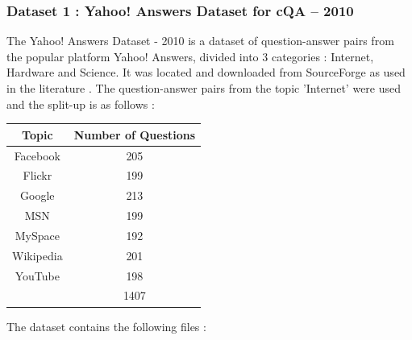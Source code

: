 \documentclass[12pt, a4paper]{article}
\begin{document}
\subsubsection{Dataset 1 : Yahoo! Answers Dataset for cQA – 2010} 

The Yahoo! Answers Dataset - 2010 is a dataset of question-answer pairs from the popular platform Yahoo! Answers, divided into 3 categories : Internet, Hardware and Science. It was located and downloaded from SourceForge \cite{dataset1} as used in the literature \cite{maincqa}. The question-answer pairs from the topic 'Internet' were used and the split-up is as follows : 

\begin{center}
  \renewcommand{\arraystretch}{1.5}
  \begin{tabular}{c|c}
    Topic&Number of Questions\\ 
    \hline 
    Facebook&205\\ 
    Flickr&199\\ 
    Google&213\\ 
    MSN&199\\ 
    MySpace&192\\ 
    Wikipedia&201\\ 
    YouTube&198\\ 
    \hline 
    &1407
\end{tabular}
\end{center} 

The dataset contains the following files : 
\end{document}
